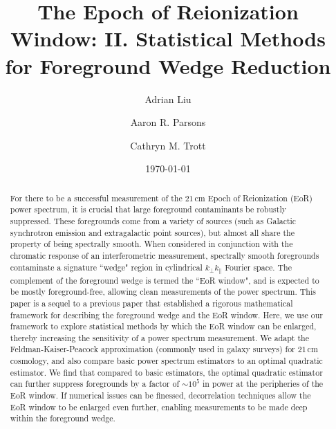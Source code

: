 \documentclass[twocolumn,aps,prd,nofootinbib,showpacs]{revtex4-1}
\begin{document}
\title{The Epoch of Reionization Window: II. Statistical Methods for Foreground Wedge Reduction}

\author{Adrian Liu}
\author{Aaron R. Parsons}
\author{Cathryn M. Trott}
\date{\today}

\newcommand{\apjs}{Astrophys. J. Suppl. Ser.}
\newcommand{\aj}{Astron. J.}
\newcommand{\mnras}{Mon. Not. R. Astron. Soc.}
\newcommand{\apjl}{Astrophys. J. Lett.}
\newcommand{\aap}{Astron. Astrophys.}
\newcommand{\pasa}{PASA}
\newcommand{\physrep}{Phys. Rep.}
\newcommand{\araa}{Annu. Rev. Astron. Astrophys.}




\begin{abstract}
For there to be a successful measurement of the $21\,\textrm{cm}$ Epoch of Reionization (EoR) power spectrum, it is crucial that large foreground contaminants be robustly suppressed.  These foregrounds come from a variety of sources (such as Galactic synchrotron emission and extragalactic point sources), but almost all share the property of being spectrally smooth.  When considered in conjunction with the chromatic response of an interferometric measurement, spectrally smooth foregrounds contaminate a signature ``wedge" region in cylindrical $k_\perp k_\parallel$ Fourier space.  The complement of the foreground wedge is termed the ``EoR window", and is expected to be mostly foreground-free, allowing clean measurements of the power spectrum.  This paper is a sequel to a previous paper that established a rigorous mathematical framework for describing the foreground wedge and the EoR window.  Here, we use our framework to explore statistical methods by which the EoR window can be enlarged, thereby increasing the sensitivity of a power spectrum measurement.  We adapt the Feldman-Kaiser-Peacock approximation (commonly used in galaxy surveys) for $21\,\textrm{cm}$ cosmology, and also compare basic power spectrum estimators to an optimal quadratic estimator.  We find that compared to basic estimators, the optimal quadratic estimator can further suppress foregrounds by a factor of $\sim 10^5$ in power at the peripheries of the EoR window.  If numerical issues can be finessed, decorrelation techniques allow the EoR window to be enlarged even further, enabling measurements to be made deep within the foreground wedge.
\end{abstract}
\end{document}

